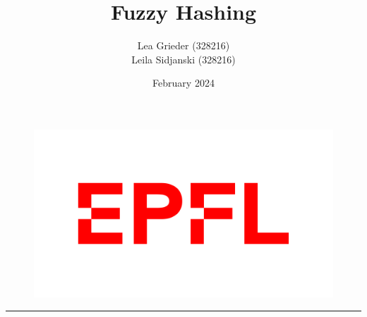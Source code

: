 \documentclass[12pt, a4paper, openany]{article}
\title{Fuzzy Hashing}
\author{Lea Grieder (328216)\\Leila Sidjanski (328216)}
\date{February 2024}
\begin{document}
\pagestyle{fancy}
\maketitle
\begin{figure}[h]
\includegraphics[scale=0.1]{latex-img/logo-epfl.png}
\centering
\end{figure}
\par\noindent\rule{\textwidth}{0.4pt}
\tableofcontents
\thispagestyle{fancy}

\newpage









\newpage

\appendix
\end{document}
